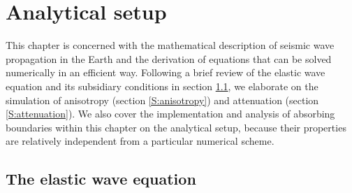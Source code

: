 \chapter{Analytical setup}\label{C:AnalyticalSetup}

This chapter is concerned with the mathematical description of
seismic wave propagation in the Earth and the derivation of
equations that can be solved numerically in an efficient way.
Following a brief review of the elastic wave equation and its
subsidiary conditions in section \ref{S:wave_equation}, we elaborate
on the simulation of anisotropy (section \ref{S:anisotropy}) and
attenuation (section \ref{S:attenuation}). We also cover the
implementation and analysis of absorbing boundaries within this
chapter on the analytical setup, because their properties are
relatively independent from a particular numerical scheme.

\section{The elastic wave equation}\label{S:wave_equation}

